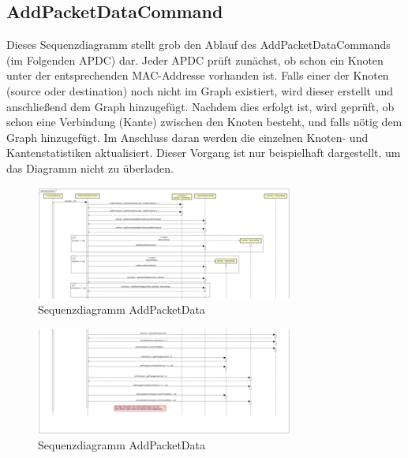 \subsection{AddPacketDataCommand}

Dieses Sequenzdiagramm stellt grob den Ablauf des AddPacketDataCommands (im Folgenden APDC) dar. Jeder APDC prüft zunächst,
ob schon ein Knoten unter der entsprechenden MAC-Addresse vorhanden ist. Falls einer der Knoten (source oder destination)
noch nicht im Graph existiert, wird dieser erstellt und anschließend dem Graph hinzugefügt. Nachdem dies erfolgt ist, wird
geprüft, ob schon eine Verbindung (Kante) zwischen den Knoten besteht, und falls nötig dem Graph hinzugefügt.
Im Anschluss daran werden die einzelnen Knoten- und Kantenstatistiken aktualisiert. Dieser Vorgang ist nur beispielhaft
dargestellt, um das Diagramm nicht zu überladen.

\begin{figure}
  \centering
  \includegraphics[width=\paperwidth]{../diagramimages/sd_AddPacketData1.png}
  \caption[Sequenzdiagramm AddPacketData]{Sequenzdiagramm AddPacketData}
\end{figure}
\FloatBarrier

\begin{figure}
  \centering
  \includegraphics[width=\paperwidth]{../diagramimages/sd_AddPacketData2.png}
  \caption[Sequenzdiagramm AddPacketData]{Sequenzdiagramm AddPacketData}
\end{figure}
\FloatBarrier